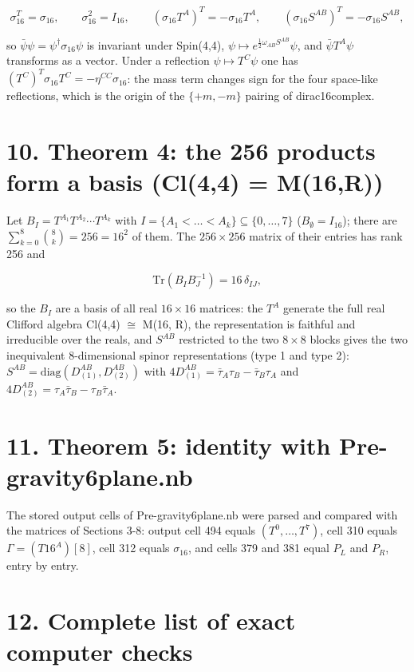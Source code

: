\documentclass[10pt]{article}
\makeatletter
\newcommand\keepnext{\par\nopagebreak\@nobreaktrue\everypar{\@nobreakfalse\everypar{}}}
\makeatother
\begin{document}
\[
\sigma_{16}^T = \sigma_{16},\qquad \sigma_{16}^2 = I_{16},\qquad (\sigma_{16}T^A)^T = -\sigma_{16}T^A,\qquad (\sigma_{16}S^{AB})^T = -\sigma_{16}S^{AB},
\]

so $\bar\psi\psi = \psi^\dagger\sigma_{16}\psi$ is invariant under Spin(4,4), $\psi \mapsto e^{\frac12\omega_{AB}S^{AB}}\psi$, and $\bar\psi T^A\psi$ transforms as a vector. Under a reflection $\psi\mapsto T^C\psi$ one has $(T^C)^T\sigma_{16}T^C = -\eta^{CC}\sigma_{16}$: the mass term changes sign for the four space-like reflections, which is the origin of the $\{+m,-m\}$ pairing of dirac16complex.


\section*{10. Theorem 4: the 256 products form a basis (Cl(4,4) = M(16,R))}

Let $B_I = T^{A_1}T^{A_2}\cdots T^{A_k}$ with $I = \{A_1<\dots<A_k\}\subseteq\{0,\dots,7\}$ ($B_\emptyset = I_{16}$); there are $\sum_{k=0}^{8}\binom8k = 256 = 16^2$ of them. The $256\times256$ matrix of their entries has rank 256 and\keepnext


\[
\mathrm{Tr}\left(B_I B_J^{-1}\right) = 16\,\delta_{IJ},
\]

so the $B_I$ are a basis of all real $16\times16$ matrices: the $T^A$ generate the full real Clifford algebra Cl(4,4) $\cong$ M(16, R), the representation is faithful and irreducible over the reals, and $S^{AB}$ restricted to the two $8\times8$ blocks gives the two inequivalent 8-dimensional spinor representations (type 1 and type 2): $S^{AB} = \mathrm{diag}(D_{(1)}^{AB}, D_{(2)}^{AB})$ with $4D_{(1)}^{AB} = \bar\tau_A\tau_B - \bar\tau_B\tau_A$ and $4D_{(2)}^{AB} = \tau_A\bar\tau_B - \tau_B\bar\tau_A$.


\section*{11. Theorem 5: identity with Pre-gravity6plane.nb}

The stored output cells of Pre-gravity6plane.nb were parsed and compared with the matrices of Sections 3-8: output cell 494 equals $(T^0,\dots,T^7)$, cell 310 equals $\Gamma = (T16^A)[8]$, cell 312 equals $\sigma_{16}$, and cells 379 and 381 equal $P_L$ and $P_R$, entry by entry.


\section*{12. Complete list of exact computer checks}
\end{document}
